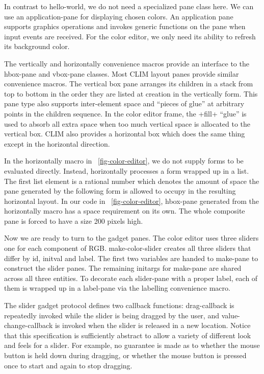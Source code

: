 \documentclass[twocolumn,a4paper]{article}
\newcommand {\code}[1]{{\sffamily #1}}
\newcommand {\CLIM}{{\small CLIM}}
\let\class\code
\let\method\code
\let\constant\code
\let\variable\code
\let\macro\code
\begin{document}
In contrast to \class{hello-world}, we do not need a specialized pane class here. We can use an application-pane for displaying chosen colors.  An application pane supports graphics operations and invokes generic functions on the pane when input events are received. For the color editor, we only need its ability to refresh its background color.

The \macro{vertically} and \macro{horizontally} convenience macros provide an interface to the \class{hbox-pane} and \class{vbox-pane} classes. Most \CLIM{} layout panes provide similar convenience macros. The vertical box pane arranges its children in a stack from top to bottom in the order they are listed at creation in the vertically form. This pane type also supports inter-element space and ``pieces of glue'' at arbitrary points in the children sequence. In the color editor frame, the \constant{+fill+} ``glue'' is used to absorb all extra space when too much vertical space is allocated to the vertical box. \CLIM{} also provides a horizontal box which does the same thing except in the horizontal direction.

In the \macro{horizontally} macro in \figurename~\ref{fig-color-editor}, we do not supply forms to be evaluated directly. Instead, \method{horizontally} processes a form wrapped up in a list. The first list element is a rational number which denotes the amount of space the pane generated by the following form is allowed to occupy in the resulting horizontal layout. In our code in \figurename~\ref{fig-color-editor}, \class{hbox-pane} generated from the \macro{horizontally} macro has a space requirement on its own. The whole composite pane is forced to have a size 200 pixels high.

Now we are ready to turn to the gadget panes. The color editor uses three sliders one for each component of RGB. \method{make-color-slider} creates all three sliders that differ by \variable{id},  \variable{initval} and \variable{label}. The first two variables are handed to \method{make-pane} to construct the slider panes. The remaining initargs for \method{make-pane} are shared across all three entities. To decorate each slider-pane with a proper label, each of them is wrapped up in a \class{label-pane} via the \macro{labelling} convenience macro.

The slider gadget protocol defines two callback functions: \method{drag-callback} is repeatedly invoked while the slider is being dragged by the user, and \method{value-change-callback} is invoked when the slider is released in a new location. Notice that this specification is sufficiently abstract to allow a variety of different look and feels for a slider. For example, no guarantee is made as to whether the mouse button is held down during dragging, or whether the mouse button is pressed once to start and again to stop dragging.
\end{document}

